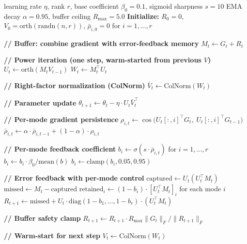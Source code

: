 \documentclass[11pt]{article}
\begin{document}
\begin{algorithm}[H]
\caption{Ada-Dion V3}
\label{alg:adadion_v3}
\begin{algorithmic}[1]
\REQUIRE learning rate $\eta$, rank $r$, base coefficient $\beta_0 = 0.1$, sigmoid sharpness $s = 10$
\REQUIRE EMA decay $\alpha = 0.95$, buffer ceiling $R_{\max} = 5.0$
\STATE \textbf{Initialize:} $R_0 = 0$, $V_0 = \text{orth}(\text{randn}(n, r))$, $\bar{\rho}_{i,0} = 0$ for $i = 1, \ldots, r$

    \STATE \textbf{// Buffer: combine gradient with error-feedback memory}
    \STATE $M_t \gets G_t + R_t$

    \STATE \textbf{// Power iteration (one step, warm-started from previous $V$)}
    \STATE $U_t \gets \text{orth}(M_t V_{t-1})$ \hfill {}
    \STATE $W_t \gets M_t^\top U_t$ \hfill {}

    \STATE \textbf{// Right-factor normalization (ColNorm)}
    \STATE $\bar{V}_t \gets \text{ColNorm}(W_t)$ \hfill {}

    \STATE \textbf{// Parameter update}
    \STATE $\theta_{t+1} \gets \theta_t - \eta \cdot U_t \bar{V}_t^\top$ \hfill {}

    \STATE \textbf{// Per-mode gradient persistence}
        \STATE $\rho_{i,t} \gets \cos\!\big(U_t[:,i]^\top G_t,\; U_t[:,i]^\top G_{t-1}\big)$ \hfill {}
        \STATE $\bar{\rho}_{i,t} \gets \alpha \cdot \bar{\rho}_{i,t-1} + (1 - \alpha) \cdot \rho_{i,t}$ \hfill {}
    \ENDFOR

    \STATE \textbf{// Per-mode feedback coefficient}
    \STATE $b_i \gets \sigma(s \cdot \bar{\rho}_{i,t})$ for $i = 1, \ldots, r$ \hfill {}
    \STATE $b_i \gets b_i \cdot \beta_0 / \text{mean}(b)$ \hfill {}
    \STATE $b_i \gets \text{clamp}(b_i, 0.05, 0.95)$

    \STATE \textbf{// Error feedback with per-mode control}
    \STATE $\text{captured} \gets U_t (U_t^\top M_t)$ \hfill {}
    \STATE $\text{missed} \gets M_t - \text{captured}$ \hfill {}
    \STATE $\text{retained}_i \gets (1 - b_i) \cdot [U_t^\top M_t]_i$ for each mode $i$ \hfill {}
    \STATE $R_{t+1} \gets \text{missed} + U_t \cdot \text{diag}(1-b_1, \ldots, 1-b_r) \cdot (U_t^\top M_t)$

    \STATE \textbf{// Buffer safety clamp}
        \STATE $R_{t+1} \gets R_{t+1} \cdot R_{\max} \|G_t\|_F / \|R_{t+1}\|_F$
    \ENDIF

    \STATE \textbf{// Warm-start for next step}
    \STATE $V_t \gets \text{ColNorm}(W_t)$

\ENDFOR
\end{algorithmic}
\end{algorithm}
\end{document}
